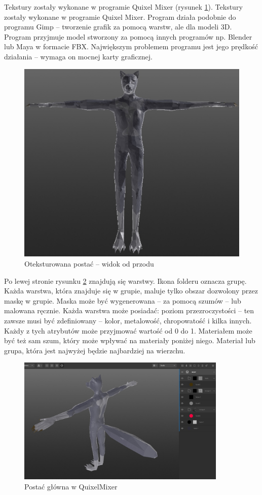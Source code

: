 \documentclass[12pt,twoside]{article}
\begin{document}
\clearpage
Tekstury zostały wykonane w programie Quixel Mixer (rysunek
\ref{Texture:FrontMC}). Tekstury zostały wykonane w programie Quixel Mixer.
Program działa podobnie do programu Gimp -- tworzenie grafik za pomocą warstw,
ale dla modeli 3D. Program przyjmuje model stworzony za pomocą innych programów
np. Blender lub Maya w formacie FBX.  Największym problemem programu jest jego
prędkość działania -- wymaga on mocnej karty graficznej.

\begin{figure}[!h]
    \centering
	\includegraphics[width=12cm]{RealizacjaProjektu/MC/TexturedMC_Front.jpg}
	\caption{Oteksturowana postać -- widok od przodu}
    \label{Texture:FrontMC}
\end{figure}

Po lewej stronie rysunku \ref{Texture:QuixelMixer} znajdują się warstwy. Ikona folderu oznacza
grupę. Każda warstwa, która znajduje się w grupie, maluje tylko obszar dozwolony
przez maskę w grupie. Maska może być wygenerowana -- za pomocą szumów -- lub
malowana ręcznie. Każda warstwa może posiadać: poziom przezroczystości -- ten
zawsze musi być zdefiniowany -- kolor, metalowość, chropowatość i kilka innych.
Każdy z tych atrybutów może przyjmować wartość od 0 do 1. Materiałem może być
też sam szum, który może wpływać na materiały poniżej niego. Materiał lub grupa,
która jest najwyżej będzie najbardziej na wierzchu.

\begin{figure}[!ht]
    \centering
	\includegraphics[width=10cm]{RealizacjaProjektu/MC/Texture_QuixelMixer.jpg}
	\caption{Postać główna w QuixelMixer}
    \label{Texture:QuixelMixer}
\end{figure}
\end{document}
